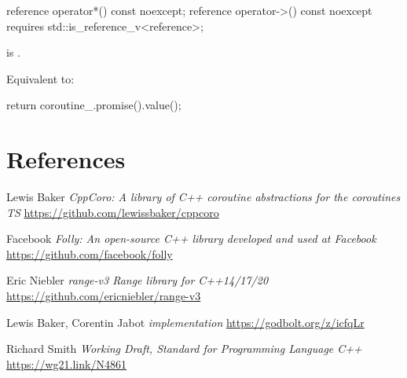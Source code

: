 \documentclass{wg21}
\begin{document}
\begin{addedblock}
\begin{itemdecl}
reference operator*() const noexcept;
reference operator->() const noexcept requires std::is_reference_v<reference>;
\end{itemdecl}

\begin{itemdescr}
    \precondition {} is .
    
    \effects
    Equivalent to:
    \begin{codeblock}
        return coroutine_.promise().value();
    \end{codeblock}
\end{itemdescr}



\end{addedblock}
    

\section{References}
\renewcommand{\section}[2]{}%



\begin{thebibliography}{9}
    Lewis Baker
    \emph{CppCoro: A library of C++ coroutine abstractions for the coroutines TS}\newline
    \url{https://github.com/lewissbaker/cppcoro}
    
    Facebook
    \emph{Folly: An open-source C++ library developed and used at Facebook}\newline
    \url{https://github.com/facebook/folly}
    
    
    Eric Niebler
    \emph{range-v3 Range library for C++14/17/20}\newline
    \url{https://github.com/ericniebler/range-v3}
    
    Lewis Baker, Corentin Jabot
    \emph{ implementation}\newline
    \url{https://godbolt.org/z/icfqLr}
    
        
    Richard Smith
    \emph{Working Draft, Standard for Programming Language C++}\newline
    \url{https://wg21.link/N4861}
    
    
\end{thebibliography}
\end{document}

